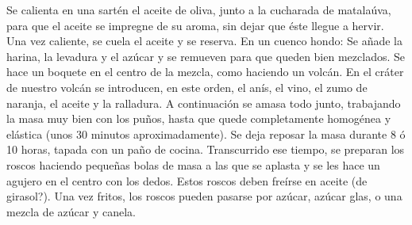 Se calienta en una sartén el aceite de oliva, junto a la cucharada de matalaúva, para que el aceite se impregne de su aroma, sin dejar que éste llegue a hervir. Una vez caliente, se cuela el aceite y se reserva.
En un cuenco hondo:
Se añade la harina, la levadura y el azúcar y se remueven para que queden bien mezclados. Se hace un boquete en el centro de la mezcla, como haciendo un volcán. En el cráter de nuestro volcán se introducen, en este orden, el anís, el vino, el zumo de naranja, el aceite y la ralladura. A continuación se amasa todo junto, trabajando la masa muy bien con los puños, hasta que quede completamente homogénea y elástica (unos 30 minutos aproximadamente). Se deja reposar la masa durante 8 ó 10 horas, tapada con un paño de cocina.
Transcurrido ese tiempo, se preparan los roscos haciendo pequeñas bolas de masa a las que se aplasta y se les hace un agujero en el centro con los dedos. Estos roscos deben freírse en aceite (de girasol?).
Una vez fritos, los roscos pueden pasarse por azúcar, azúcar glas, o una mezcla de azúcar y canela.
